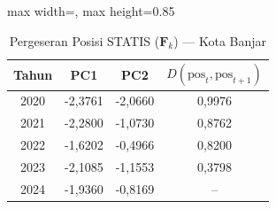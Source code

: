 \begin{table}[H]
\centering
\caption{Pergeseran Posisi STATIS ($\mathbf{F}_k$) --- Kota Banjar} \label{tab:app2jarak_statis_skor_kota_banjar}
\begin{adjustbox}{max width=\textwidth, max height=0.85\textheight}
\begin{tabular}{|c|c|c|c|}
\hline
\textbf{Tahun} & \textbf{PC1} & \textbf{PC2} & \textbf{$D(\text{pos}_t, \text{pos}_{t+1})$} \\
\hline
2020 & -2,3761 & -2,0660 & 0,9976 \\
2021 & -2,2800 & -1,0730 & 0,8762 \\
2022 & -1,6202 & -0,4966 & 0,8200 \\
2023 & -2,1085 & -1,1553 & 0,3798 \\
2024 & -1,9360 & -0,8169 & -- \\
\hline
\end{tabular}
\end{adjustbox}
\end{table}